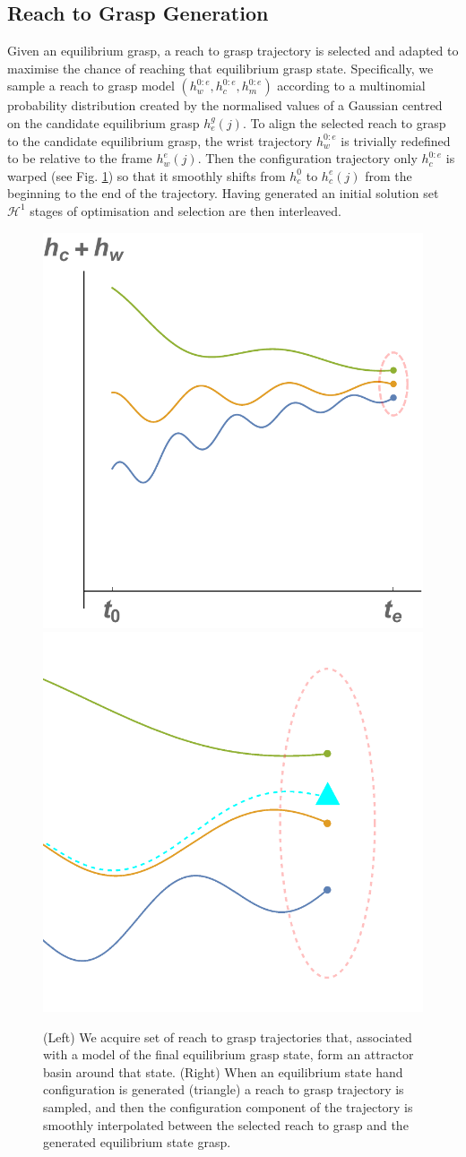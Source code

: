\subsection{Reach to Grasp Generation}
Given an equilibrium grasp, a reach to grasp trajectory is selected and adapted to maximise the chance of reaching that equilibrium grasp state. Specifically, we sample a reach to grasp model $(h_w^{0:e} , h_c^{0:e} , h_m^{0:e})$ according to a multinomial probability distribution created by the normalised values of a Gaussian centred on the candidate equilibrium grasp $h_e^g(j)$. To align the selected reach to grasp to the candidate equilibrium grasp, the wrist trajectory $h_w^{0:e}$ is trivially redefined to be relative to the frame $h_w^{e}(j)$. Then the configuration trajectory only $h_c^{0:e}$ is warped (see Fig. \ref{fig:reaches}) so that it smoothly shifts from $h_c^{0}$ to $h_c^{e}(j)$ from the beginning to the end of the trajectory. 
Having generated an initial solution set $\mathcal{H}^{1}$ stages of optimisation and selection are then interleaved.

\begin{figure}

 \includegraphics[width=0.45\linewidth]{images/config_space_plots/2_basin_of_attraction}
  \includegraphics[width=0.45\linewidth]{images/config_space_plots/5_trajectory_adaptation}
 \caption{{(Left) We acquire set of reach to grasp trajectories that, associated with a model of the final equilibrium grasp state, form an attractor basin around that state. (Right) When an equilibrium state hand configuration is generated (triangle) a reach to grasp trajectory is sampled, and then the configuration component of the trajectory is smoothly interpolated between the selected reach to grasp and the generated equilibrium state grasp.}}
  \label{fig:reaches}
\end{figure}

